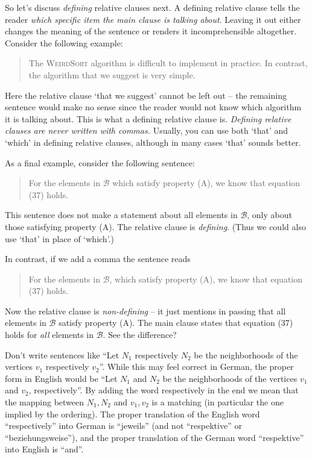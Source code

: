 So let's discuss \emph{defining} relative clauses next. A defining
relative clause tells the reader \emph{which specific item the main
  clause is talking about}. Leaving it out either changes the meaning
of the sentence or renders it incomprehensible altogether.  Consider
the following example:

\begin{quote}
  The \textsc{WeirdSort} algorithm is difficult to implement in
  practice. In contrast, the algorithm that we suggest is very simple.
\end{quote}

Here the relative clause `that we suggest' cannot be left out -- the
remaining sentence would make no sense since the reader would not know
which algorithm it is talking about. This is what a defining relative
clause is. \textit{Defining relative clauses are never written with
  commas.} Usually, you can use both `that' and `which' in defining
relative clauses, although in many cases `that' sounds better.

As a final example, consider the following sentence:
\begin{quote}
  For the elements in \(\mathcal{B}\) which satisfy property (A), we
  know that equation (37) holds.
\end{quote}
This sentence does not make a statement about all elements in
\(\mathcal{B}\), only about those satisfying property (A). The relative
clause is \emph{defining}. (Thus we could also use `that' in place of
`which'.)

In contrast, if we add a comma the sentence reads
\begin{quote}
  For the elements in \(\mathcal{B}\), which satisfy property (A), we
  know that equation (37) holds.
\end{quote}

Now the relative clause is \emph{non-defining} -- it just mentions in
passing that all elements in \(\mathcal{B}\) satisfy property (A). The
main clause states that equation (37) holds for \emph{all} elements in
\(\mathcal{B}\). See the difference?

\begin{Rule}
  Don't write sentences like ``Let $N_1$ respectively $N_2$ be the neighborhoods of the vertices $v_1$ respectively $v_2$''. While this may feel correct in German, the proper form in English would be 
  ``Let $N_1$ and $N_2$ be the neighborhoods of the vertices $v_1$ and $v_2$, respectively''. By adding the word respectively in the end we mean that the mapping between $N_1, N_2$ and $v_1, v_2$ is a matching (in particular the one implied by the ordering).
  The proper translation of the English word ``respectively'' into German is ``jeweils'' (and not ``respektive'' or ``beziehungsweise''), and the proper translation of the German word ``respektive'' into English is ``and''.
\end{Rule}

